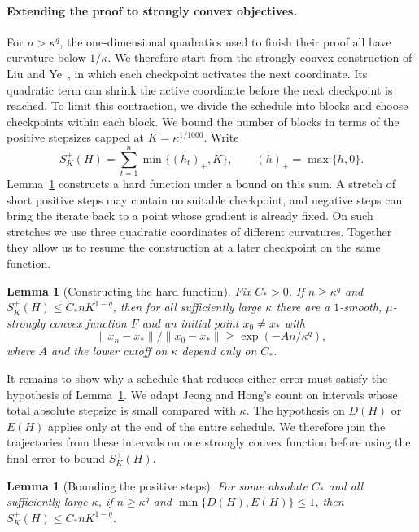 \documentclass[11pt]{article}
\newtheorem{lemma}[theorem]{Lemma}
\theoremstyle{definition}
\begin{document}
\paragraph{Extending the proof to strongly convex objectives.}
For $n>\kappa^q$, the one-dimensional quadratics used to finish their proof all have curvature below $1/\kappa$. We therefore start from the strongly convex construction of Liu and Ye~\cite[Sections~4--5]{LY}, in which each checkpoint activates the next coordinate. Its quadratic term can shrink the active coordinate before the next checkpoint is reached. To limit this contraction, we divide the schedule into blocks and choose checkpoints within each block. We bound the number of blocks in terms of the positive stepsizes capped at $K=\kappa^{1/1000}$. Write
\[
 S_K^+(H)=\sum_{t=1}^n\min\{(h_t)_+,K\},\qquad (h)_+=\max\{h,0\}.
\]
Lemma~\ref{lem:block} constructs a hard function under a bound on this sum. A stretch of short positive steps may contain no suitable checkpoint, and negative steps can bring the iterate back to a point whose gradient is already fixed. On such stretches we use three quadratic coordinates of different curvatures. Together they allow us to resume the construction at a later checkpoint on the same function.

\begin{lemma}[Constructing the hard function]\label{lem:block}
Fix $C_*>0$. If $n\ge\kappa^q$ and $S_K^+(H)\le C_*nK^{1-q}$, then for all sufficiently large $\kappa$ there are a $1$-smooth, $\mu$-strongly convex function $F$ and an initial point $x_0\ne x_*$ with
\[
 \|x_n-x_*\|/\|x_0-x_*\|\ge \exp(-A n/\kappa^q),
\]
where $A$ and the lower cutoff on $\kappa$ depend only on $C_*$.
\end{lemma}

It remains to show why a schedule that reduces either error must satisfy the hypothesis of Lemma~\ref{lem:block}. We adapt Jeong and Hong's count on intervals whose total absolute stepsize is small compared with $\kappa$. The hypothesis on $D(H)$ or $E(H)$ applies only at the end of the entire schedule. We therefore join the trajectories from these intervals on one strongly convex function before using the final error to bound $S_K^+(H)$.

\begin{lemma}[Bounding the positive steps]\label{lem:count}
For some absolute $C_*$ and all sufficiently large $\kappa$, if $n\ge\kappa^q$ and $\min\{D(H),E(H)\}\le1$, then $S_K^+(H)\le C_*nK^{1-q}$.
\end{lemma}
\end{document}
